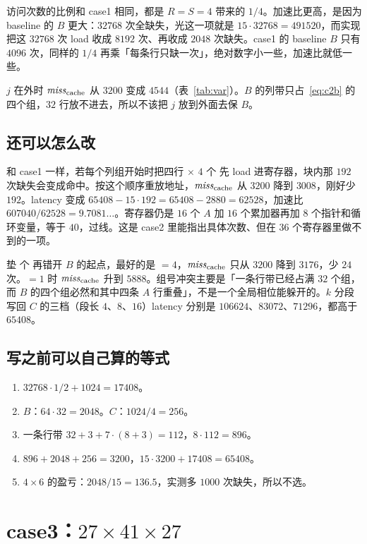 访问次数的比例和 case1 相同，都是 $R=S=4$ 带来的 $1/4$。加速比更高，是因为 baseline 的 $B$ 更大：$32768$ 次全缺失，光这一项就是 $15\cdot32768=491520$，而实现把这 $32768$ 次 load 收成 $8192$ 次、再收成 $2048$ 次缺失。case1 的 baseline $B$ 只有 $4096$ 次，同样的 $1/4$ 再乘「每条行只缺一次」，绝对数字小一些，加速比就低一些。

$j$ 在外时 $\mathit{miss}_{\mathrm{cache}}$ 从 $3200$ 变成 $4544$（表~\ref{tab:var}）。$B$ 的列带只占~\eqref{eq:c2b} 的四个组，$32$ 行放不进去，所以不该把 $j$ 放到外面去保 $B$。

\subsection{还可以怎么改}

和 case1 一样，若每个列组开始时把四行 $\times$ $4$ 个  先 load 进寄存器，块内那 $192$ 次缺失会变成命中。按这个顺序重放地址，$\mathit{miss}_{\mathrm{cache}}$ 从 $3200$ 降到 $3008$，刚好少 $192$。latency 变成 $65408-15\cdot192=65408-2880=62528$，加速比 $607040/62528=9.7081\ldots$。寄存器仍是 $16$ 个 $A$ 加 $16$ 个累加器再加 $8$ 个指针和循环变量，等于 $40$，过线。这是 case2 里能指出具体次数、但在 $36$ 个寄存器里做不到的一项。

垫  个  再错开 $B$ 的起点，最好的是 $=4$，$\mathit{miss}_{\mathrm{cache}}$ 只从 $3200$ 降到 $3176$，少 $24$ 次。$=1$ 时 $\mathit{miss}_{\mathrm{cache}}$ 升到 $5888$。组号冲突主要是「一条行带已经占满 $32$ 个组，而 $B$ 的四个组必然和其中四条 $A$ 行重叠」，不是一个全局相位能躲开的。$k$ 分段写回 $C$ 的三档（段长 $4$、$8$、$16$）latency 分别是 $106624$、$83072$、$71296$，都高于 $65408$。

\subsection{写之前可以自己算的等式}

\begin{enumerate}
  \item $32768\cdot1/2+1024=17408$。
  \item $B$：$64\cdot32=2048$。$C$：$1024/4=256$。
  \item 一条行带 $32+3+7\cdot(8+3)=112$，$8\cdot112=896$。
  \item $896+2048+256=3200$，$15\cdot3200+17408=65408$。
  \item $4\times6$ 的盈亏：$2048/15=136.5$，实测多 $1000$ 次缺失，所以不选。
\end{enumerate}

\section{case3：\texorpdfstring{$27\times 41\times 27$}{27x41x27}}
\label{sec:c3}

